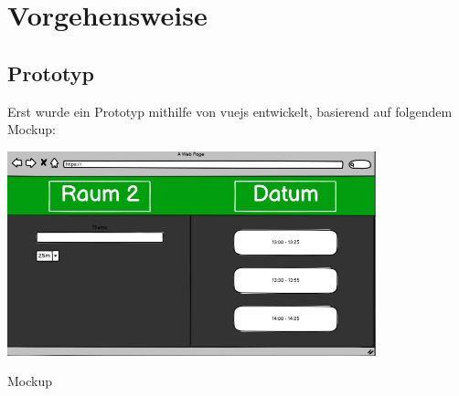 
\pagebreak
\section{Vorgehensweise}
\subsection{Prototyp}
Erst wurde ein Prototyp mithilfe von vuejs entwickelt, basierend auf folgendem Mockup:
\par\vspace{1cm}
    \centering
    \includegraphics[width=0.8\textwidth]{Bilder/mockup}
    \caption{Mockup}
    \label{fig:Mockup}
\par\vspace{1cm}
\raggedright